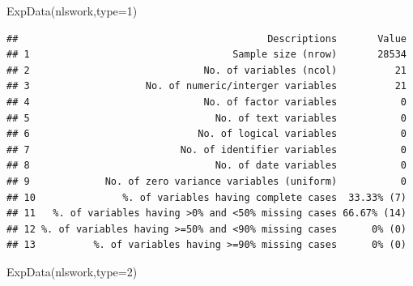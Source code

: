 \documentclass[
]{article}
\newenvironment{Shaded}{\begin{snugshade}}{\end{snugshade}}
\newcommand{\AttributeTok}[1]{\textcolor[rgb]{0.77,0.63,0.00}{#1}}
\newcommand{\DecValTok}[1]{\textcolor[rgb]{0.00,0.00,0.81}{#1}}
\newcommand{\FunctionTok}[1]{\textcolor[rgb]{0.00,0.00,0.00}{#1}}
\newcommand{\NormalTok}[1]{#1}
\begin{document}
\begin{Shaded}
\begin{Highlighting}[]
  \FunctionTok{ExpData}\NormalTok{(nlswork,}\AttributeTok{type=}\DecValTok{1}\NormalTok{)}
\end{Highlighting}
\end{Shaded}

\begin{verbatim}
##                                           Descriptions       Value
## 1                                   Sample size (nrow)       28534
## 2                              No. of variables (ncol)          21
## 3                    No. of numeric/interger variables          21
## 4                              No. of factor variables           0
## 5                                No. of text variables           0
## 6                             No. of logical variables           0
## 7                          No. of identifier variables           0
## 8                                No. of date variables           0
## 9             No. of zero variance variables (uniform)           0
## 10               %. of variables having complete cases  33.33% (7)
## 11   %. of variables having >0% and <50% missing cases 66.67% (14)
## 12 %. of variables having >=50% and <90% missing cases      0% (0)
## 13          %. of variables having >=90% missing cases      0% (0)
\end{verbatim}

\begin{Shaded}
\begin{Highlighting}[]
  \FunctionTok{ExpData}\NormalTok{(nlswork,}\AttributeTok{type=}\DecValTok{2}\NormalTok{)}
\end{Highlighting}
\end{Shaded}
\end{document}

